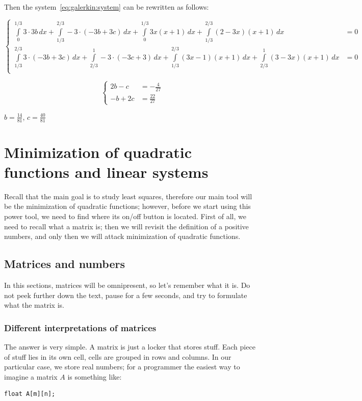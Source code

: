 \documentclass[notitlepage]{report}
\begin{document}
Then the system~\eqref{eq:galerkin:system} can be rewritten as follows:

$$
\left\{
\begin{split}
\int\limits_{0}^{1/3} 3\cdot 3b\,dx + \int\limits_{1/3}^{2/3} -3\cdot (-3b+3c)\, dx + \int\limits_{0}^{1/3} 3x(x+1)\,dx + \int\limits_{1/3}^{2/3}(2-3x)(x+1)\,dx &= 0\\
\int\limits_{1/3}^{2/3} 3\cdot (-3b+3c)\,dx + \int\limits_{2/3}^{1} -3\cdot (-3c+3)\, dx + \int\limits_{1/3}^{2/3} (3x-1)(x+1)\,dx + \int\limits_{2/3}^{1}(3-3x)(x+1)\,dx &= 0\\
\end{split}
\right.
$$

$$
\left\{
\begin{split}
2b - c &= -\frac{4}{27}\\
-b + 2c &= \frac{22}{27}
\end{split}
\right.
$$

$b=\frac{14}{81}$, $c=\frac{40}{81}$





\chapter{Minimization of quadratic functions and linear systems}

Recall that the main goal is to study least squares, therefore our main tool will be the minimization of quadratic functions;
however, before we start using this power tool, we need to find where its on/off button is located.
First of all, we need to recall what a matrix is; then we will revisit the definition of a positive numbers, and only then we will attack minimization of quadratic functions.

\section{Matrices and numbers}
In this sections, matrices will be omnipresent, so let's remember what it is.
Do not peek further down the text, pause for a few seconds, and try to formulate what the matrix is.

\subsection{Different interpretations of matrices}

The answer is very simple. A matrix is just a locker that stores stuff.
Each piece of stuff lies in its own cell, cells are grouped in rows and columns.
In our particular case, we store real numbers; for a programmer the easiest way to imagine a matrix $A$ is something like:
\begin{verbatim}
float A[m][n];
\end{verbatim}
\end{document}
